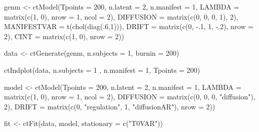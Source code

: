 \documentclass[nojss]{jss}\usepackage[]{graphicx}\usepackage[]{color}
\begin{document}

\begin{Schunk}
\begin{Sinput}
genm <- ctModel(Tpoints = 200, n.latent = 2, n.manifest = 1, 
  LAMBDA = matrix(c(1, 0), nrow = 1, ncol = 2),
  DIFFUSION = matrix(c(0, 0, 0, 1), 2),
  MANIFESTVAR = t(chol(diag(.6,1))),
  DRIFT = matrix(c(0, -.1, 1, -.2), nrow = 2),   
  CINT = matrix(c(1, 0), nrow = 2))

data <- ctGenerate(genm, n.subjects = 1, burnin = 200)

ctIndplot(data, n.subjects = 1 , n.manifest = 1, Tpoints = 200)

model <- ctModel(Tpoints = 200, n.latent = 2, n.manifest = 1, 
  LAMBDA = matrix(c(1, 0), nrow = 1, ncol = 2),
  DIFFUSION = matrix(c(0, 0, 0, "diffusion"), 2),
  DRIFT = matrix(c(0, "regulation", 1, "diffusionAR"), nrow = 2))

fit <- ctFit(data, model, stationary = c("T0VAR"))
\end{Sinput}
\end{Schunk}
\end{document}
